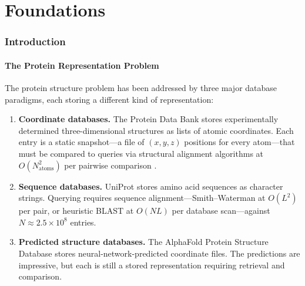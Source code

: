 \documentclass[11pt,twocolumn,a4paper]{article}
\theoremstyle{definition}
\theoremstyle{remark}
\begin{document}

\part{Foundations}

\section{Introduction}
\label{sec:introduction}

\subsection{The Protein Representation Problem}

The protein structure problem has been addressed by three major database paradigms, each storing a different kind of representation:

\begin{enumerate}[nosep]
\item \textbf{Coordinate databases.} The Protein Data Bank \citep{berman2000} stores experimentally determined three-dimensional structures as lists of atomic coordinates. Each entry is a static snapshot---a file of $(x, y, z)$ positions for every atom---that must be compared to queries via structural alignment algorithms at $O(N_{\mathrm{atoms}}^2)$ per pairwise comparison \citep{holm1993}.

\item \textbf{Sequence databases.} UniProt \citep{uniprot2023} stores amino acid sequences as character strings. Querying requires sequence alignment---Smith--Waterman \citep{smith1981} at $O(L^2)$ per pair, or heuristic BLAST \citep{altschul1990} at $O(NL)$ per database scan---against $N \approx 2.5 \times 10^8$ entries.

\item \textbf{Predicted structure databases.} The AlphaFold Protein Structure Database \citep{jumper2021, varadi2022} stores neural-network-predicted coordinate files. The predictions are impressive, but each is still a stored representation requiring retrieval and comparison.
\end{enumerate}
\end{document}
